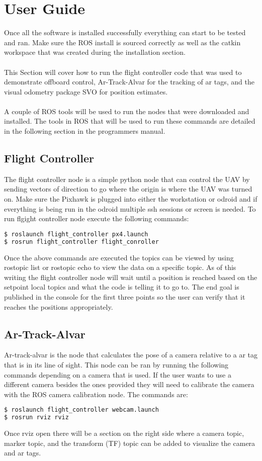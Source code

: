 \section{User Guide}
Once all the software is installed successfully everything can start to be tested and ran. Make sure the ROS install is sourced correctly as well as the catkin workspace that was created during the installation section.\\
\\
This Section will cover how to run the flight controller code that was used to demonstrate offboard control, Ar-Track-Alvar for the tracking of ar tags, and the visual odometry package SVO for position estimates.\\
\\
A couple of ROS tools will be used to run the nodes that were downloaded and installed. The tools in ROS that will be used to run these commands are detailed in the following section in the programmers manual.

\subsection{Flight Controller}
The flight controller node is a simple python node that can control the UAV by sending vectors of direction to go where the origin is where the UAV was turned on. Make sure the Pixhawk is plugged into either the workstation or odroid and if everything is being run in the odroid multiple ssh sessions or screen is needed. To run flgight controller node execute the following commands:
\begin{lstlisting}[language=bash]
$ roslaunch flight_controller px4.launch
$ rosrun flight_controller flight_conroller
\end{lstlisting}
Once the above commands are executed the topics can be viewed by using rostopic list or rostopic echo to view the data on a specific topic. As of this writing the flight controller node will wait until a position is reached based on the setpoint local topics and what the code is telling it to go to. The end goal is published in the console for the first three points so the user can verify that it reaches the positions appropriately. 
\subsection{Ar-Track-Alvar}
Ar-track-alvar is the node that calculates the pose of a camera relative to a ar tag that is in its line of sight. This node can be ran by running the following commands depending on a camera that is used. If the user wants to use a different camera besides the ones provided they will need to calibrate the camera with the ROS camera calibration node. The commands are:
\begin{lstlisting}[language=bash]
$ roslaunch flight_controller webcam.launch
$ rosrun rviz rviz
\end{lstlisting}
Once rviz open there will be a section on the right side where a camera topic, marker topic, and the transform (TF) topic can be added to visualize the camera and ar tags.
